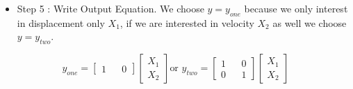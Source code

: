 \documentclass[12pt,a4paper]{article}
\begin{document}
	\begin{itemize}
		\item Step 5 : Write Output Equation. We choose \(y=y_{one}\) because we only interest in displacement only \(X_1\), if we are interested in velocity \(X_2\) as well we choose \(y=y_{two}\).
	\end{itemize}
	\[
	y_{one} =
	\begin{bmatrix}
		1 &   & 0 
	\end{bmatrix}
	\begin{bmatrix}
		X_1 \\
		X_2 
	\end{bmatrix} \text{or  }
	y_{two} = 
	\begin{bmatrix}
		1 &   & 0 \\
		0 &   & 1 
	\end{bmatrix}
	\begin{bmatrix}
		X_1 \\
		X_2 
	\end{bmatrix}
	\]
	
	
	
\end{document}
